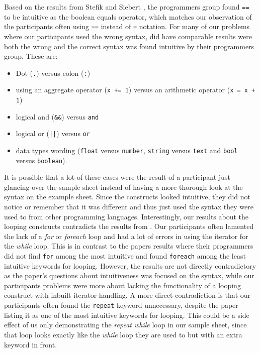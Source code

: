 Based on the results from Stefik and Siebert \cite{Empiricalinvestigation}, the programmers group found \lstinline!==! to be intuitive as the boolean equals operator, which matches our observation of the participants often using \lstinline!==! instead of \lstinline!=! notation. For many of our problems where our participants used the wrong syntax, \cite{Empiricalinvestigation} did have comparable results were both the wrong and the correct syntax was found intuitive by their programmers group. These are: 
\begin{itemize}
\item Dot (\lstinline!.!) versus colon (\lstinline!:!)
\item using an aggregate operator (\lstinline!x += 1!) versus an arithmetic operator (\lstinline!x = x + 1!)
\item logical and (\lstinline!&&!) versus \lstinline!and!
\item logical or (\lstinline!||!) versus \lstinline!or!
\item data types wording (\lstinline!float! versus \lstinline!number!, \lstinline!string! versus \lstinline!text! and \lstinline!bool! versus \lstinline!boolean!). 
\end{itemize}

It is possible that a lot of these cases were the result of a participant just glancing over the sample sheet instead of having a more thorough look at the syntax on the example sheet. Since the constructs looked intuitive, they did not notice or remember that it was different and thus just used the syntax they were used to from other programming languages. Interestingly, our results about the looping constructs contradicts the results from \cite{Empiricalinvestigation}. Our participants often lamented the lack of a \textit{for} or \textit{foreach} loop and had a lot of errors in using the iterator for the \textit{while} loop. This is in contrast to the papers results where their programmers did not find \lstinline!for! among the most intuitive and found \lstinline!foreach! among the least intuitive keywords for looping. However, the results are not directly contradictory as the paper's questions about intuitiveness was focused on the syntax, while our participants problems were more about lacking the functionality of a looping construct with inbuilt iterator handling. A more direct contradiction is that our participants often found the \lstinline!repeat! keyword unnecessary, despite the paper listing it as one of the most intuitive keywords for looping. This could be a side effect of us only demonstrating the \textit{repeat while} loop in our sample sheet, since that loop looks exactly like the \textit{while} loop they are used to but with an extra keyword in front. 


